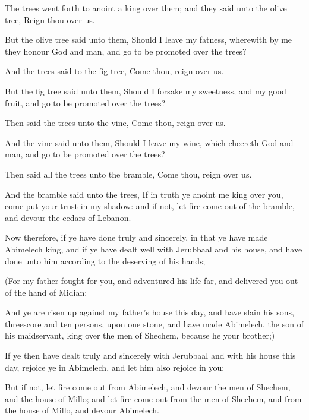 {The
trees went
forth
{} to
anoint a
king over them; and they
said unto the olive
tree,
Reign thou over us.

But the olive
tree
said unto them, Should I
leave my
fatness, wherewith by me they
honour
God and
man, and
go to be
promoted over the
trees?

And the
trees
said to the fig
tree,
Come thou,
{}
reign over us.

But the fig
tree
said unto them, Should I
forsake my
sweetness, and my
good
fruit, and
go to be
promoted over the
trees?

Then
said the
trees unto the
vine,
Come thou,
{}
reign over us.

And the
vine
said unto them, Should I
leave my
wine, which
cheereth
God and
man, and
go to be
promoted over the
trees?

Then
said all the
trees unto the
bramble,
Come thou,
{}
reign over us.

And the
bramble
said unto the
trees, If in
truth ye
anoint me
king over you,
{}
come
{} put your
trust in my
shadow: and if not, let
fire come
out of the
bramble, and
devour the
cedars of
Lebanon.

Now therefore, if ye have
done
truly and
sincerely, in that ye have made
Abimelech
king, and if ye have
dealt
well with
Jerubbaal and his
house, and have
done unto him according to the
deserving of his
hands;

(For my
father
fought for you, and
adventured his
life
far, and
delivered you out of the
hand of
Midian:

And ye are risen
up against my
father’s
house this
day, and have
slain his
sons, threescore and
ten
persons, upon
one
stone, and have made
Abimelech, the
son of his
maidservant,
king over the
men of
Shechem, because he
{} your
brother;)

If ye then have
dealt
truly and
sincerely with
Jerubbaal and with his
house this
day,
{}
rejoice ye in
Abimelech, and let him also
rejoice in you:

But if not, let
fire come
out from
Abimelech, and
devour the
men of
Shechem, and the
house of
Millo; and let
fire come
out from the
men of
Shechem, and from the
house of
Millo, and
devour
Abimelech.

}

